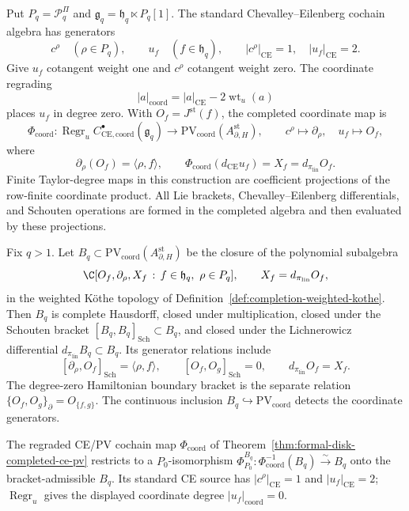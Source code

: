 Put \(P_q=\mathcal P^\Pi_q\) and
\(\mathfrak g_q=\mathfrak h_q\ltimes P_q[1]\).  The standard
Chevalley--Eilenberg cochain algebra has generators
\[
  c^\rho\quad(\rho\in P_q),\qquad
  u_f\quad(f\in\mathfrak h_q),\qquad
  |c^\rho|_{\mathrm{CE}}=1,\quad
  |u_f|_{\mathrm{CE}}=2.
\]
Give \(u_f\) cotangent weight one and \(c^\rho\) cotangent weight
zero.  The coordinate regrading
\[
  |a|_{\mathrm{coord}}
  =|a|_{\mathrm{CE}}-2\operatorname{wt}_u(a)
\]
places \(u_f\) in degree zero.  With
\(O_f=J^{\mathrm{st}}(f)\), the completed coordinate map is
\[
  \Phi_{\mathrm{coord}}\colon
  \operatorname{Regr}_u
  C^\bullet_{\mathrm{CE},\mathrm{coord}}(\mathfrak g_q)
  \longrightarrow
  \mathrm{PV}_{\mathrm{coord}}
    (A_{\partial,H}^{\mathrm{st}}),
  \qquad
  c^\rho\longmapsto\partial_\rho,\quad
  u_f\longmapsto O_f,
\]
where
\[
  \partial_\rho(O_f)=\langle\rho,f\rangle,
  \qquad
  \Phi_{\mathrm{coord}}(d_{\mathrm{CE}}u_f)
  =X_f=d_{\pi_{\mathrm{lin}}}O_f.
\]
Finite Taylor-degree maps in this construction are coefficient
projections of the row-finite coordinate product.  All Lie brackets,
Chevalley--Eilenberg differentials, and Schouten operations are formed
in the completed algebra and then evaluated by these projections.

\begin{defn}
\label{def:completion-bracket-admissible}
Fix \(q>1\).  Let
\(B_q\subset
\mathrm{PV}_{\mathrm{coord}}(A_{\partial,H}^{\mathrm{st}})\)
be the closure of the polynomial subalgebra
\[
  \C[O_f,\partial_\rho,X_f\,:\,
    f\in\mathfrak h_q,\ \rho\in P_q],
  \qquad X_f=d_{\pi_{\mathrm{lin}}}O_f,
\]
in the weighted K\"othe topology of
Definition~\ref{def:completion-weighted-kothe}.  Then \(B_q\) is
complete Hausdorff, closed under multiplication, closed under the
Schouten bracket
\([B_q,B_q]_{\mathrm{Sch}}\subset B_q\), and closed under the
Lichnerowicz differential
\(d_{\pi_{\mathrm{lin}}}B_q\subset B_q\).  Its generator relations
include
\[
  [\partial_\rho,O_f]_{\mathrm{Sch}}
  =\langle\rho,f\rangle,\qquad
  [O_f,O_g]_{\mathrm{Sch}}=0,\qquad
  d_{\pi_{\mathrm{lin}}}O_f=X_f.
\]
The degree-zero Hamiltonian boundary bracket is the separate relation
\(\{O_f,O_g\}_\partial=O_{\{f,g\}}\).  The continuous inclusion
\(B_q\hookrightarrow\mathrm{PV}_{\mathrm{coord}}\) detects the
coordinate generators.
\end{defn}

\begin{thm}
\label{thm:completion-p0-lift}
The regraded CE/PV cochain map
\(\Phi_{\mathrm{coord}}\) of
Theorem~\ref{thm:formal-disk-completed-ce-pv} restricts to a
\(P_0\)-isomorphism
\(\Phi^{B_q}_{P_0}:\Phi^{-1}_{\mathrm{coord}}(B_q)\xrightarrow{\sim}B_q\)
onto the bracket-admissible \(B_q\).  Its standard CE source has
\(|c^\rho|_{\mathrm{CE}}=1\) and \(|u_f|_{\mathrm{CE}}=2\);
\(\operatorname{Regr}_u\) gives the displayed coordinate degree
\(|u_f|_{\mathrm{coord}}=0\).
\end{thm}

